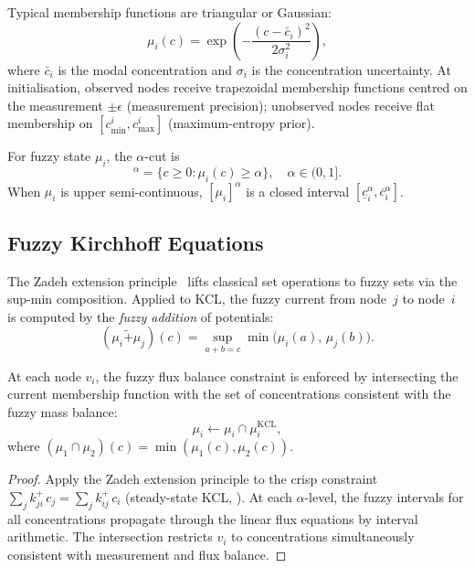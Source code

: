 Typical membership functions are triangular or Gaussian:
\begin{equation}
  \mu_i(c) = \exp\!\left(-\frac{(c - \bar{c}_i)^2}{2\sigma_i^2}\right),
  \label{eq:gaussian-membership}
\end{equation}
where $\bar{c}_i$ is the modal concentration and $\sigma_i$ is the
concentration uncertainty.  At initialisation, observed nodes receive
trapezoidal membership functions centred on the measurement $\pm \epsilon$
(measurement precision); unobserved nodes receive flat membership on
$[c_{\min}^i, c_{\max}^i]$ (maximum-entropy prior).

\begin{definition}
\label{def:alpha-cuts}
For fuzzy state $\mu_i$, the $\alpha$-cut is
\begin{equation}
  [\mu_i]^{\alpha}
  = \{c \geq 0 : \mu_i(c) \geq \alpha\},
  \quad \alpha \in (0,1].
\end{equation}
When $\mu_i$ is upper semi-continuous, $[\mu_i]^{\alpha}$ is a closed
interval $[\underline{c}_i^{\alpha}, \overline{c}_i^{\alpha}]$.
\end{definition}

\subsection{Fuzzy Kirchhoff Equations}

The Zadeh extension principle~\citep{Zadeh1965} lifts classical set
operations to fuzzy sets via the sup-min composition.  Applied to KCL,
the fuzzy current from node~$j$ to node~$i$ is computed by the
\emph{fuzzy addition} of potentials:
\begin{equation}
  (\mu_i \mathbin{\tilde{+}} \mu_j)(c)
  = \sup_{a+b=c} \min\!\bigl(\mu_i(a),\,\mu_j(b)\bigr).
  \label{eq:fuzzy-kcl}
\end{equation}

\begin{theorem}
\label{thm:fuzzy-kcl}
At each node $v_i$, the fuzzy flux balance constraint is enforced by
intersecting the current membership function with the set of concentrations
consistent with the fuzzy mass balance:
\begin{equation}
  \mu_i \leftarrow \mu_i \cap \mu_i^{\mathrm{KCL}},
  \label{eq:fuzzy-kcl-update}
\end{equation}
where $(\mu_1 \cap \mu_2)(c) = \min(\mu_1(c), \mu_2(c))$.
\end{theorem}

\begin{proof}
Apply the Zadeh extension principle to the crisp constraint
$\sum_j k_{ji}^{+}\,c_j = \sum_j k_{ij}^{+}\,c_i$ (steady-state KCL,
).  At each $\alpha$-level, the fuzzy intervals for
all concentrations propagate through the linear flux equations by interval
arithmetic.  The intersection restricts $v_i$ to concentrations
simultaneously consistent with measurement and flux balance.
\end{proof}

